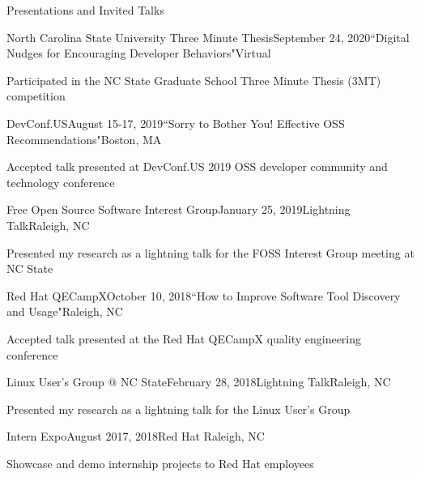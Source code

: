 \documentclass{resume} %
\begin{document}
\begin{rSection}{Presentations and Invited Talks}
\begin{rSubsection}{North Carolina State University Three Minute Thesis}{September 24, 2020}{``Digital Nudges for Encouraging Developer Behaviors"}{Virtual}
\item Participated in the NC State Graduate School Three Minute Thesis (3MT) competition
\end{rSubsection}
\vspace{-5pt}
\begin{rSubsection}{DevConf.US}{August 15-17, 2019}{``Sorry to Bother You! Effective OSS Recommendations"}{Boston, MA}
\item Accepted talk presented at DevConf.US 2019 OSS developer community and technology conference
\end{rSubsection}
\vspace{-5pt}

\begin{rSubsection}{Free Open Source Software Interest Group}{January 25, 2019}{Lightning Talk}{Raleigh, NC}
\item Presented my research as a lightning talk for the FOSS Interest Group meeting at NC State
\end{rSubsection}
\vspace{-5pt}

\begin{rSubsection}{Red Hat QECampX}{October 10, 2018}{``How to Improve Software Tool Discovery and Usage"}{Raleigh, NC}
\item Accepted talk presented at the Red Hat QECampX quality engineering conference
\end{rSubsection}
\vspace{-5pt}

\begin{rSubsection}{Linux User's Group @ NC State}{February 28, 2018}{Lightning Talk}{Raleigh, NC}
\item Presented my research as a lightning talk for the Linux User's Group
\end{rSubsection}
\vspace{-5pt}

\begin{rSubsection}{Intern Expo}{August 2017, 2018}{Red Hat }{Raleigh, NC}
\item Showcase and demo internship projects to Red Hat employees
\end{rSubsection}
\vspace{-5pt}


\end{rSection}
\end{document}
